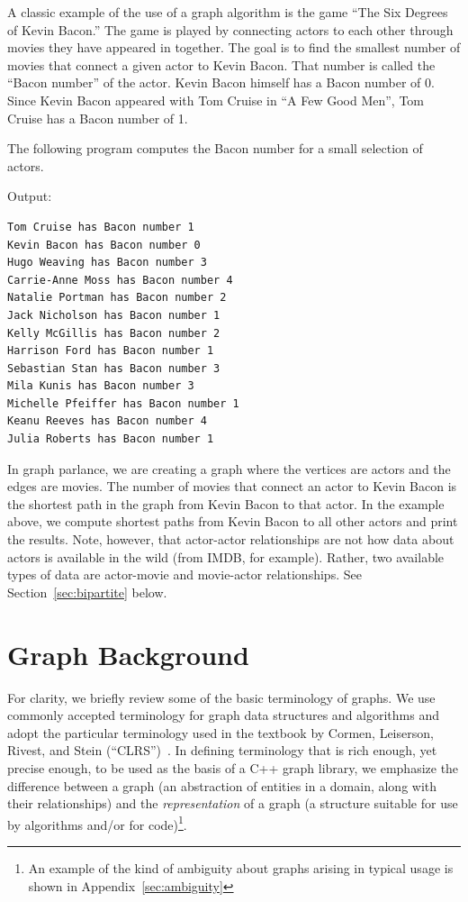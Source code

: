 A classic example of the use of a graph algorithm is the game ``The Six Degrees of Kevin Bacon.''
The game is played by connecting actors to each other through movies they have appeared in together.
The goal is to find the smallest number of movies that connect a given actor to Kevin Bacon.
That number is called the ``Bacon number'' of the actor. Kevin Bacon himself has a Bacon number of 0.
Since Kevin Bacon appeared with Tom Cruise in ``A Few Good Men'', Tom Cruise has a Bacon number of 1.

The following program computes the Bacon number for a small selection of actors.

{\small
  
}


\noindent
Output:
\begin{lstlisting}
Tom Cruise has Bacon number 1
Kevin Bacon has Bacon number 0
Hugo Weaving has Bacon number 3
Carrie-Anne Moss has Bacon number 4
Natalie Portman has Bacon number 2
Jack Nicholson has Bacon number 1
Kelly McGillis has Bacon number 2
Harrison Ford has Bacon number 1
Sebastian Stan has Bacon number 3
Mila Kunis has Bacon number 3
Michelle Pfeiffer has Bacon number 1
Keanu Reeves has Bacon number 4
Julia Roberts has Bacon number 1    
\end{lstlisting}  


In graph parlance, we are creating a graph where the vertices are actors and the edges are movies.
The number of movies that connect an actor to Kevin Bacon is the shortest path in the graph
from Kevin Bacon to that actor. In the example above, we compute shortest paths from Kevin
Bacon to all other actors and print the results.
Note, however, that actor-actor relationships are not how data about actors
is available in the wild (from IMDB, for example).  Rather, two available types of data are actor-movie and movie-actor relationships.  See Section~\ref{sec:bipartite} below.


\section{Graph Background} %

For clarity, we briefly review some of the basic terminology of graphs.
We use commonly accepted terminology for graph data structures and algorithms and
adopt the particular terminology used in the textbook by
Cormen, Leiserson, Rivest, and Stein (``CLRS'')~\cite{CLRS2022}.
%
In defining terminology that is rich enough, yet precise enough, to be used as the basis of a C++ graph library, we emphasize the difference between a graph (an abstraction of entities in a domain, along with their relationships) and the \emph{representation} of a graph (a structure suitable for use by algorithms and/or for code)\footnote{An example of the kind of ambiguity about graphs arising in typical usage is shown in Appendix~\ref{sec:ambiguity}}.

